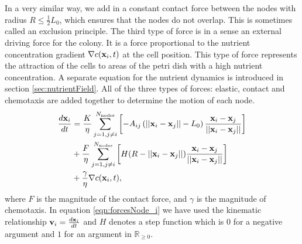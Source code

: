 In a very similar way, we add in a constant contact force between the nodes with radius $R \leq \frac{1}{2}L_0$,
which ensures that the nodes do not overlap. This is sometimes called an exclusion principle. The third 
type of force is in a sense an external driving force for the colony. It is a force 
proportional to the nutrient concentration gradient $\nabla c(\vb{x}_i, t)$ at the cell position. This type of 
force represents the attraction of the cells to areas of the petri dish with a high nutrient concentration.
A separate equation for the nutrient dynamics is introduced in section \ref{sec:nutrientField}. 
All of the three types of forces: elastic, contact and chemotaxis are added together to 
determine the motion of each node.
\begin{equation} \label{eqn:forcesNode_i}
    \begin{split}
        \frac{d \vb{x}_i}{dt} &= 
        \frac{K}{ \eta}\sum_{j = 1, j \neq i}^{N_{\textrm{nodes}}}   \left[ - A_{ij} \left( ||\vb{x}_i - \vb{x}_j|| - L_0\right) \frac{\vb{x}_i - \vb{x}_j}{||\vb{x}_i - \vb{x}_j||} \right]\\
         &+ \frac{F}{ \eta}\sum_{j = 1, j \neq i}^{N_{\textrm{nodes}}} \left[ H(R - ||\vb{x}_i - \vb{x}_j||) \frac{\vb{x}_i - \vb{x}_j}{||\vb{x}_i - \vb{x}_j||}     \right]\\ 
         &+ \frac{\gamma}{\eta} \nabla c (\vb{x}_i, t),
    \end{split}
\end{equation}
where $F$ is the magnitude of the contact force, and $\gamma$ is the magnitude of chemotaxis. In equation 
\ref{eqn:forcesNode_i} we have used the kinematic relationship $\vb{v}_i = \frac{d \vb{x}_i}{dt}$ and 
$H$ denotes a step function which is $0$ for a negative argument and $1$ for an argument in 
$\mathbb{R}_{\geq 0}$.



